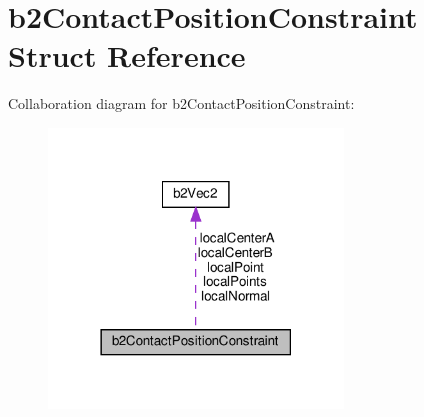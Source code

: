 \hypertarget{structb2ContactPositionConstraint}{}\section{b2\+Contact\+Position\+Constraint Struct Reference}
\label{structb2ContactPositionConstraint}


Collaboration diagram for b2\+Contact\+Position\+Constraint\+:
\nopagebreak
\begin{figure}[H]
\begin{center}
\leavevmode
\includegraphics[width=222pt]{structb2ContactPositionConstraint__coll__graph}
\end{center}
\end{figure}

